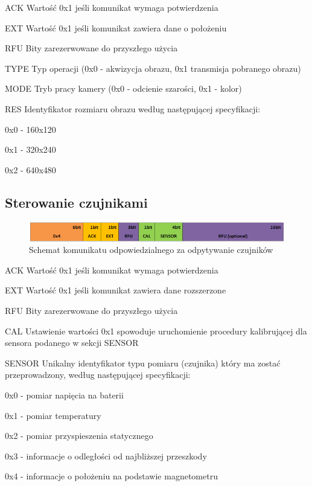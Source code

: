 \begin{basedescript}{\desclabelstyle{\pushlabel}\desclabelwidth{25mm}}
\setlength{\parsep}{0pt}
\setlength{\itemsep}{0mm}
\setlength{\parskip}{0pt}
\item[ACK]
	Wartość 0x1 jeśli komunikat wymaga potwierdzenia
\item[EXT] 
	Wartość 0x1 jeśli komunikat zawiera dane o położeniu
\item[RFU] 
	Bity zarezerwowane do przyszłego użycia
\item[TYPE] 
	Typ operacji (0x0 - akwizycja obrazu, 0x1 transmisja pobranego obrazu)
\item[MODE] 
	Tryb pracy kamery (0x0 - odcienie szarości, 0x1 - kolor)
\item[RES] 
	Identyfikator rozmiaru obrazu według następującej specyfikacji:
	\begin{desc}
	\item[0x0] - 160x120
	\item[0x1] - 320x240
	\item[0x2] - 640x480
	\end{desc} 
\end{basedescript}

\subsection{Sterowanie czujnikami}
\begin{figure}[h!] 
 \centering
 \includegraphics[width=\textwidth]{../images/appendix/cmd_0x04.png}
 \caption{Schemat komunikatu odpowiedzialnego za odpytywanie czujników}
 \label{fig:CMD_0x04}
\end{figure}

\begin{basedescript}{\desclabelstyle{\pushlabel}\desclabelwidth{25mm}}
\setlength{\parsep}{0pt}
\setlength{\itemsep}{0mm}
\setlength{\parskip}{0pt}
\item[ACK]
	Wartość 0x1 jeśli komunikat wymaga potwierdzenia
\item[EXT] 
	Wartość 0x1 jeśli komunikat zawiera dane rozszerzone
\item[RFU] 
	Bity zarezerwowane do przyszłego użycia
\item[CAL] 
	Ustawienie wartości 0x1 spowoduje uruchomienie procedury kalibrującej
	dla sensora podanego w sekcji SENSOR
\item[SENSOR] 
	Unikalny identyfikator typu pomiaru (czujnika) który ma zostać przeprowadzony,
	według następującej specyfikacji:
	\begin{desc}
	\item[0x0] - pomiar napięcia na baterii
	\item[0x1] - pomiar temperatury
	\item[0x2] - pomiar przyspieszenia statycznego
	\item[0x3] - informacje o odległości od najbliższej przeszkody
	\item[0x4] - informacje o położeniu na podstawie magnetometru
	\end{desc}
\end{basedescript}

